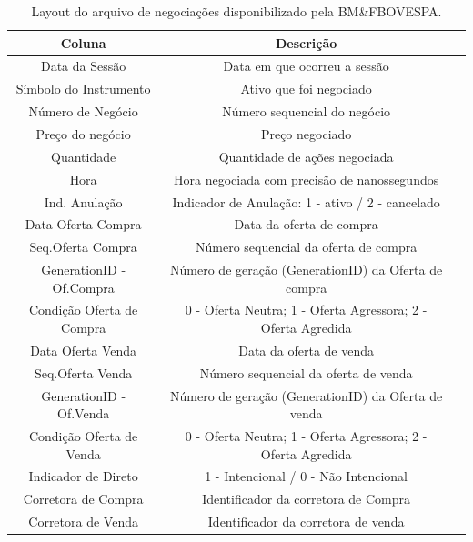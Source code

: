 \documentclass[grad,numbers]{coppe}
\begin{document}
        \begin{table}[h]
      \caption{Layout do arquivo de negociações disponibilizado pela BM\&FBOVESPA.}
      \label{tab:layout-neg}
      \centering
      {\footnotesize
      \begin{tabular}{|c|c|c|}
        \hline
        Coluna & Descrição\\
        \hline
        Data da Sessão & Data em que ocorreu a sessão\\
        \hline
        Símbolo do Instrumento & Ativo que foi negociado\\
        \hline
        Número de Negócio & Número sequencial do negócio\\
        \hline
        Preço do negócio & Preço negociado\\
        \hline
        Quantidade & Quantidade de ações negociada\\
        \hline
        Hora & Hora negociada com precisão de nanossegundos\\
        \hline
        Ind. Anulação & Indicador de Anulação: 1 - ativo / 2 - cancelado\\
        \hline
        Data Oferta Compra & Data da oferta de compra\\
        \hline
        Seq.Oferta Compra & Número sequencial da oferta de compra\\
        \hline
        GenerationID - Of.Compra & Número de geração (GenerationID) da Oferta de compra\\
        \hline
        Condição Oferta de Compra & 0 - Oferta Neutra; 1 - Oferta Agressora; 2 - Oferta Agredida\\
        \hline
        Data Oferta Venda & Data da oferta de venda\\
        \hline
        Seq.Oferta Venda & Número sequencial da oferta de venda\\
        \hline
        GenerationID - Of.Venda & Número de geração (GenerationID) da Oferta de venda\\
        \hline
        Condição Oferta de Venda & 0 - Oferta Neutra; 1 - Oferta Agressora; 2 - Oferta Agredida\\
        \hline
        Indicador de Direto & 1 - Intencional / 0 - Não Intencional\\
        \hline
        Corretora de Compra & Identificador da corretora de Compra\\
        \hline
        Corretora de Venda & Identificador da corretora de venda\\
        
        \hline
      \end{tabular}}
      \end{table}
      
\end{document}
